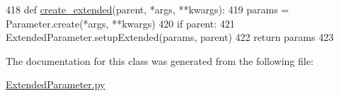 \begin{DoxyCode}
418     \textcolor{keyword}{def }\hyperlink{classsoftware_1_1chipwhisperer_1_1common_1_1api_1_1ExtendedParameter_1_1ConfigParameter_a0bc0ed2fc0f4ea21cc6f32da25bdc37f}{create\_extended}(parent, *args, **kwargs):
419         params = Parameter.create(*args, **kwargs)
420         \textcolor{keywordflow}{if} parent:
421             ExtendedParameter.setupExtended(params, parent)
422         \textcolor{keywordflow}{return} params
423 \end{DoxyCode}


The documentation for this class was generated from the following file\+:\begin{DoxyCompactItemize}
\item 
\hyperlink{ExtendedParameter_8py}{Extended\+Parameter.\+py}\end{DoxyCompactItemize}
